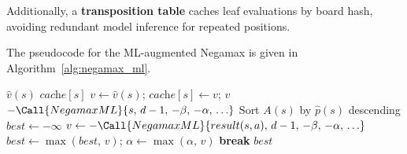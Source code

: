 Additionally, a \textbf{transposition table} caches leaf evaluations by board hash, avoiding redundant model inference for repeated positions.

The pseudocode for the ML-augmented Negamax is given in Algorithm~\ref{alg:negamax_ml}.

\begin{algorithm}[H]
\caption{ML-Augmented Negamax with Alpha-Beta Pruning}
\label{alg:negamax_ml}
\begin{algorithmic}[1]
        \State \Return $\hat{v}(s)$ 
    \EndIf
         \Return $\textit{cache}[s]$ \EndIf
        \State $v \gets \hat{v}(s)$; $\textit{cache}[s] \gets v$; \Return $v$
    \EndIf
        \State \Return $-\Call{NegamaxML}{s,\, d-1,\, -\beta,\, -\alpha,\, \ldots}$
    \EndIf
        \State Sort $A(s)$ by $\hat{p}(s)$ descending 
    \EndIf
    \State $\textit{best} \gets -\infty$
        \State $v \gets -\Call{NegamaxML}{result(s,a),\, d-1,\, -\beta,\, -\alpha,\, \ldots}$
        \State $\textit{best} \gets \max(\textit{best},\, v)$; $\alpha \gets \max(\alpha,\, v)$
        \If{$\alpha \geq \beta$} \textbf{break} \EndIf {}
    \EndFor
    \State \Return $\textit{best}$
\EndFunction
\end{algorithmic}
\end{algorithm}
